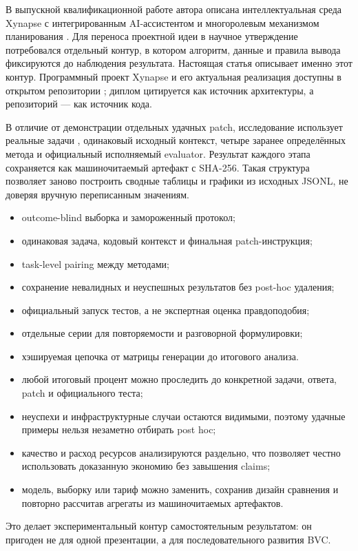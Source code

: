 \documentclass[11pt]{article}
\begin{document}
В выпускной квалификационной работе автора описана интеллектуальная среда
Xynapse с интегрированным AI-ассистентом и многоролевым механизмом
планирования \cite{khalilov2026}. Для переноса проектной идеи в научное
утверждение потребовался отдельный контур, в котором алгоритм, данные и
правила вывода фиксируются до наблюдения результата. Настоящая статья
описывает именно этот контур. Программный проект Xynapse и его актуальная
реализация доступны в открытом репозитории \cite{xynapse2026}; диплом
цитируется как источник архитектуры, а репозиторий --- как источник кода.

В отличие от демонстрации отдельных удачных patch, исследование использует
реальные задачи \dataset{} \cite{jimenez2024swebench}, одинаковый исходный
контекст, четыре заранее определённых метода и официальный исполняемый
evaluator. Результат каждого этапа сохраняется как машиночитаемый артефакт
с SHA-256. Такая структура позволяет заново построить сводные таблицы и
графики из исходных JSONL, не доверяя вручную переписанным значениям.

\begin{resultbox}
\begin{itemize}
  \item outcome-blind выборка и замороженный протокол;
  \item одинаковая задача, кодовый контекст и финальная patch-инструкция;
  \item task-level pairing между методами;
  \item сохранение невалидных и неуспешных результатов без post-hoc удаления;
  \item официальный запуск тестов, а не экспертная оценка правдоподобия;
  \item отдельные серии для повторяемости и разговорной формулировки;
  \item хэшируемая цепочка от матрицы генерации до итогового анализа.
\end{itemize}
\end{resultbox}

\begin{resultbox}
\begin{itemize}
  \item любой итоговый процент можно проследить до конкретной задачи, ответа,
        patch и официального теста;
  \item неуспехи и инфраструктурные случаи остаются видимыми, поэтому удачные
        примеры нельзя незаметно отбирать post hoc;
  \item качество и расход ресурсов анализируются раздельно, что позволяет
        честно использовать доказанную экономию без завышения claims;
  \item модель, выборку или тариф можно заменить, сохранив дизайн сравнения и
        повторно рассчитав агрегаты из машиночитаемых артефактов.
\end{itemize}
Это делает экспериментальный контур самостоятельным результатом: он пригоден
не для одной презентации, а для последовательного развития BVC.
\end{resultbox}
\end{document}
